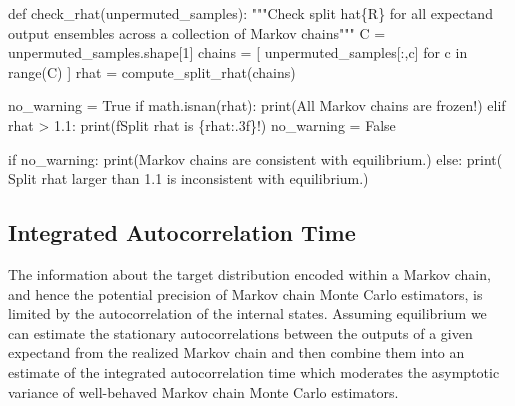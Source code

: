 \documentclass[
  letterpaper,
  DIV=11,
  numbers=noendperiod]{scrartcl}
\newenvironment{Shaded}{\begin{snugshade}}{\end{snugshade}}
\newcommand{\BuiltInTok}[1]{\textcolor[rgb]{0.00,0.23,0.31}{#1}}
\newcommand{\CommentTok}[1]{\textcolor[rgb]{0.37,0.37,0.37}{#1}}
\newcommand{\ControlFlowTok}[1]{\textcolor[rgb]{0.00,0.23,0.31}{#1}}
\newcommand{\DecValTok}[1]{\textcolor[rgb]{0.68,0.00,0.00}{#1}}
\newcommand{\FloatTok}[1]{\textcolor[rgb]{0.68,0.00,0.00}{#1}}
\newcommand{\KeywordTok}[1]{\textcolor[rgb]{0.00,0.23,0.31}{#1}}
\newcommand{\NormalTok}[1]{\textcolor[rgb]{0.00,0.23,0.31}{#1}}
\newcommand{\OperatorTok}[1]{\textcolor[rgb]{0.37,0.37,0.37}{#1}}
\newcommand{\SpecialCharTok}[1]{\textcolor[rgb]{0.37,0.37,0.37}{#1}}
\newcommand{\SpecialStringTok}[1]{\textcolor[rgb]{0.13,0.47,0.30}{#1}}
\newcommand{\StringTok}[1]{\textcolor[rgb]{0.13,0.47,0.30}{#1}}
\newcommand{\VariableTok}[1]{\textcolor[rgb]{0.07,0.07,0.07}{#1}}
\begin{document}
\begin{Shaded}
\begin{Highlighting}[]
\KeywordTok{def}\NormalTok{ check\_rhat(unpermuted\_samples):}
  \CommentTok{"""Check split hat\{R\} for all expectand output ensembles across}
\CommentTok{     a collection of Markov chains"""}
\NormalTok{  C }\OperatorTok{=}\NormalTok{ unpermuted\_samples.shape[}\DecValTok{1}\NormalTok{]}
\NormalTok{  chains }\OperatorTok{=}\NormalTok{ [ unpermuted\_samples[:,c] }\ControlFlowTok{for}\NormalTok{ c }\KeywordTok{in} \BuiltInTok{range}\NormalTok{(C) ]}
\NormalTok{  rhat }\OperatorTok{=}\NormalTok{ compute\_split\_rhat(chains)}

\NormalTok{  no\_warning }\OperatorTok{=} \VariableTok{True}
  \ControlFlowTok{if}\NormalTok{ math.isnan(rhat):}
    \BuiltInTok{print}\NormalTok{(}\StringTok{\textquotesingle{}All Markov chains are frozen!\textquotesingle{}}\NormalTok{)}
  \ControlFlowTok{elif}\NormalTok{ rhat }\OperatorTok{\textgreater{}} \FloatTok{1.1}\NormalTok{:}
    \BuiltInTok{print}\NormalTok{(}\SpecialStringTok{f\textquotesingle{}Split rhat is }\SpecialCharTok{\{}\NormalTok{rhat}\SpecialCharTok{:.3f\}}\SpecialStringTok{!\textquotesingle{}}\NormalTok{)}
\NormalTok{    no\_warning }\OperatorTok{=} \VariableTok{False}
 
  \ControlFlowTok{if}\NormalTok{ no\_warning:}
    \BuiltInTok{print}\NormalTok{(}\StringTok{\textquotesingle{}Markov chains are consistent with equilibrium.\textquotesingle{}}\NormalTok{)}
  \ControlFlowTok{else}\NormalTok{:}
    \BuiltInTok{print}\NormalTok{(}\StringTok{\textquotesingle{}  Split rhat larger than 1.1 is inconsistent with equilibrium.\textquotesingle{}}\NormalTok{)}
\end{Highlighting}
\end{Shaded}

\hypertarget{integrated-autocorrelation-time}{%
\subsection{Integrated Autocorrelation
Time}\label{integrated-autocorrelation-time}}

The information about the target distribution encoded within a Markov
chain, and hence the potential precision of Markov chain Monte Carlo
estimators, is limited by the autocorrelation of the internal states.
Assuming equilibrium we can estimate the stationary autocorrelations
between the outputs of a given expectand from the realized Markov chain
and then combine them into an estimate of the integrated autocorrelation
time which moderates the asymptotic variance of well-behaved Markov
chain Monte Carlo estimators.
\end{document}
